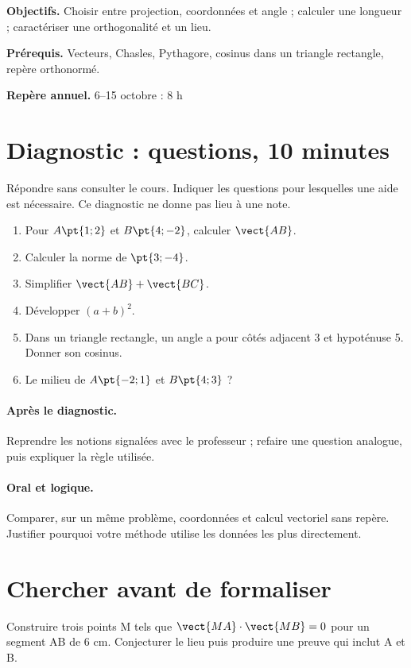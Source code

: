 \label{C03}
\begin{keypoint}
\textbf{Objectifs.} Choisir entre projection, coordonnées et angle ; calculer une longueur ; caractériser une orthogonalité et un lieu.

\textbf{Prérequis.} Vecteurs, Chasles, Pythagore, cosinus dans un triangle rectangle, repère orthonormé.

\textbf{Repère annuel.} 6–15 octobre : 8 h\end{keypoint}
\section*{Diagnostic :  questions, 10 minutes}\label{C03-D}
Répondre sans consulter le cours. Indiquer les questions pour lesquelles une aide est nécessaire. Ce diagnostic ne donne pas lieu à une note.
\begin{enumerate}
\item Pour $A\pt{1;2}$ et $B\pt{4;-2}$, calculer $\vect{AB}$.
\item Calculer la norme de $\pt{3;-4}$.
\item Simplifier $\vect{AB}+\vect{BC}$.
\item Développer $(a+b)^2$.
\item Dans un triangle rectangle, un angle a pour côtés adjacent 3 et hypoténuse 5. Donner son cosinus.
\item Le milieu de $A\pt{-2;1}$ et $B\pt{4;3}$ ?
\end{enumerate}
\paragraph{Après le diagnostic.} Reprendre les notions signalées avec le professeur ; refaire une question analogue, puis expliquer la règle utilisée.
\paragraph{Oral et logique.} Comparer, sur un même problème, coordonnées et calcul vectoriel sans repère. Justifier pourquoi votre méthode utilise les données les plus directement.
\mxnewpage
\section*{Chercher avant de formaliser}\label{C03-RECH}
Construire trois points M tels que $\vect{MA}\cdot\vect{MB}=0$ pour un segment AB de 6 cm. Conjecturer le lieu puis produire une preuve qui inclut A et B.

